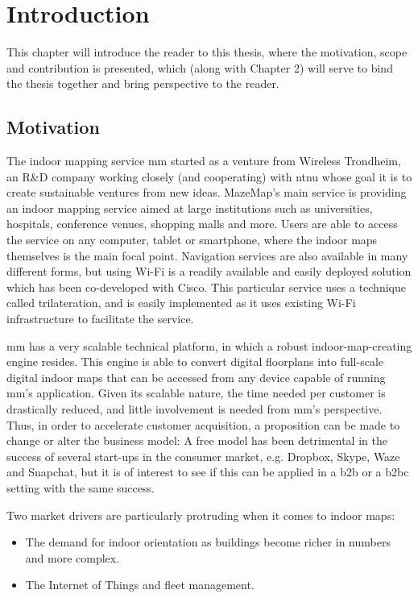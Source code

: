 \chapter{Introduction}
This chapter will introduce the reader to this thesis, where the motivation, scope and contribution is presented, which (along with Chapter 2) will serve to bind the thesis together and bring perspective to the reader.
\section{Motivation}


The indoor mapping service \gls{mm} started as a venture from Wireless Trondheim, an R\&D company working closely (and cooperating) with \gls{ntnu} whose goal it is to create sustainable ventures from new ideas. MazeMap's main service is providing an indoor mapping service aimed at large institutions such as universities, hospitals, conference venues, shopping malls and more. Users are able to access the service on any computer, tablet or smartphone, where the indoor maps themselves is the main focal point. Navigation services are also available in many different forms, but using Wi-Fi is a readily available and easily deployed solution which has been co-developed with Cisco. This particular service uses a technique called trilateration\cite{BiczokMJK14}, and is easily implemented as it uses existing Wi-Fi infrastructure to facilitate the service.


\gls{mm} has a very scalable technical platform, in which a robust indoor-map-creating engine resides. This engine is able to convert digital floorplans into full-scale digital indoor maps that can be accessed from any device capable of running \gls{mm}'s application. Given its scalable nature, the time needed per customer is drastically reduced, and little involvement is needed from \gls{mm}'s perspective. Thus, in order to accelerate customer acquisition, a proposition can be made to change or alter the business model: A free model has been detrimental in the success of several start-ups in the consumer market, e.g. Dropbox, Skype, Waze and Snapchat, but it is of interest to see if this can be applied in a \gls{b2b} or a \gls{b2bc} setting with the same success.


Two market drivers are particularly protruding when it comes to indoor maps:
\begin{itemize}
    \item The demand for indoor orientation as buildings become richer in numbers and more complex.
    \item The Internet of Things and fleet management.
\end{itemize}


